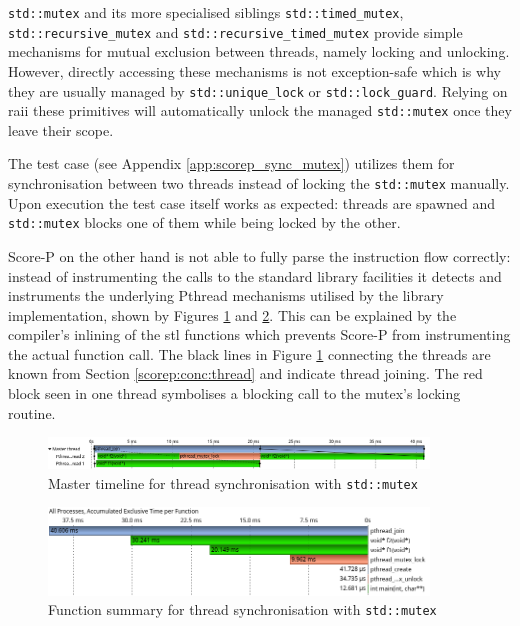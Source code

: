 \texttt{std::mutex} and its more specialised siblings \texttt{std::timed\_mutex}, \texttt{std::recursive\_mutex} and \texttt{std::recursive\_timed\_mutex} provide simple mechanisms for mutual exclusion between threads, namely locking and unlocking. However, directly accessing these mechanisms is not exception-safe which is why they are usually managed by \texttt{std::unique\_lock} or \texttt{std::lock\_guard}. Relying on \gls{raii} these primitives will automatically unlock the managed \texttt{std::mutex} once they leave their scope.

The test case (see Appendix \ref{app:scorep_sync_mutex}) utilizes them for synchronisation between two threads instead of locking the \texttt{std::mutex} manually. Upon execution the test case itself works as expected: threads are spawned and \texttt{std::mutex} blocks one of them while being locked by the other.

Score-P on the other hand is not able to fully parse the instruction flow correctly: instead of instrumenting the calls to the standard library facilities it detects and instruments the underlying Pthread mechanisms utilised by the library implementation, shown by Figures \ref{scorep:sync_pthread_mutex_timeline} and \ref{scorep:sync_pthread_mutex_summary}. This can be explained by the compiler's inlining of the \gls{stl} functions which prevents Score-P from instrumenting the actual function call. The black lines in Figure \ref{scorep:sync_pthread_mutex_timeline} connecting the threads are known from Section \ref{scorep:conc:thread} and indicate thread joining. The red block seen in one thread symbolises a blocking call to the mutex's locking routine.

\begin{figure}[htbp]
	\begin{center}
		\includegraphics[width=0.9\textwidth]{img/scorep_pthread_mutex_timeline.png}
		\caption{Master timeline for thread synchronisation with \texttt{std::mutex}}
		\label{scorep:sync_pthread_mutex_timeline}
	\end{center}
\end{figure}

\begin{figure}[htbp]
	\begin{center}
		\includegraphics[width=0.9\textwidth]{img/scorep_pthread_mutex_summary.png}
		\caption{Function summary for thread synchronisation with \texttt{std::mutex}}
		\label{scorep:sync_pthread_mutex_summary}
	\end{center}
\end{figure}


